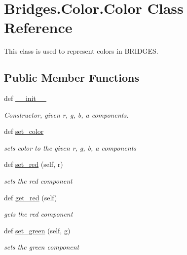 \hypertarget{class_bridges_1_1_color_1_1_color}{}\section{Bridges.\+Color.\+Color Class Reference}
\label{class_bridges_1_1_color_1_1_color}


This class is used to represent colors in B\+R\+I\+D\+G\+E\+S.  


\subsection*{Public Member Functions}
\begin{DoxyCompactItemize}
\item 
def \hyperlink{class_bridges_1_1_color_1_1_color_ad8440a552c6411f70377efc7e6cb91ab}{\+\_\+\+\_\+init\+\_\+\+\_\+}
\begin{DoxyCompactList}\small\item\em Constructor, given r, g, b, a components. \end{DoxyCompactList}\item 
def \hyperlink{class_bridges_1_1_color_1_1_color_a6ad50716df6952c7e9a8f66beea2063e}{set\+\_\+color}
\begin{DoxyCompactList}\small\item\em sets color to the given r, g, b, a components \end{DoxyCompactList}\item 
def \hyperlink{class_bridges_1_1_color_1_1_color_a8e2c7504d49723b525e08d7518a5dcfd}{set\+\_\+red} (self, r)
\begin{DoxyCompactList}\small\item\em sets the red component \end{DoxyCompactList}\item 
def \hyperlink{class_bridges_1_1_color_1_1_color_a5bb6cb1066b378968cdb7e61acc3e350}{get\+\_\+red} (self)
\begin{DoxyCompactList}\small\item\em gets the red component \end{DoxyCompactList}\item 
def \hyperlink{class_bridges_1_1_color_1_1_color_a6aa178a4f074320fd1da522d446585b8}{set\+\_\+green} (self, g)
\begin{DoxyCompactList}\small\item\em sets the green component \end{DoxyCompactList}\item 

\end{DoxyCompactItemize}
